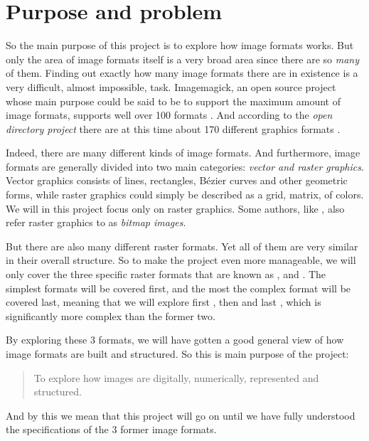 \begin{comment}
  
\end{comment}

\chapter{Purpose and problem}

So the main purpose of this project is to explore how image formats
works. But only the area of image formats itself is a very broad area
since there are so \textit{many} of them. Finding out exactly how many
image formats there are in existence is a very difficult, almost
impossible, task. Imagemagick, an open source project whose main
purpose could be said to be to support the maximum amount of image
formats, supports well over 100 formats
\cite{11:imagemagick_home}. And according to the \textit{open
  directory project} there are at this time about 170 different
graphics formats \cite{10:opendirectory_data_formats}.

Indeed, there are many different kinds of image formats. And
furthermore, image formats are generally divided into two main
categories: \textit{vector and raster
  graphics}\cite{murray1996encyclopedia,roelofs99:_png}. Vector
graphics consists of lines, rectangles, B\'{e}zier curves and other geometric
forms, while raster graphics could simply be described as a grid,
matrix, of colors. We will in this project focus only on raster
graphics. Some authors, like \cite{murray1996encyclopedia}, also refer
raster graphics to as \textit{bitmap images}.

But there are also many different raster formats. Yet all of them are
very similar in their overall structure. So to make the project even
more manageable, we will only cover the three specific raster formats
that are known as \tga, \gif and \png. The simplest formats will be
covered first, and the most the complex format will be covered last,
meaning that we will explore first \tga, then \gif and last \png, which is
significantly more complex than the former two.

By exploring these 3 formats, we will have gotten a good general view
of how image formats are built and structured. So this is main purpose
of the project:

\begin{quote}
  To explore how images are digitally, numerically, represented and
  structured.
\end{quote}

And by this we mean that this project will go on until we have fully
understood the specifications of the 3 former image formats.
